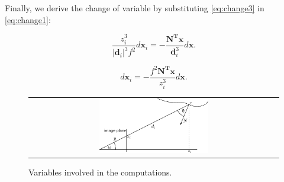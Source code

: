 Finally, we derive the change of variable by substituting \eqref{eq:change3} in  \eqref{eq:change1}:


\begin{equation}
\label{eq:change4}
    \frac{z_i^3}{|\mathbf{d}_i|^3 f^2}d\mathbf{x}_i = -\frac{\mathbf{N^T x}}{\mathbf{d}_i^3}d\mathbf{x}.
\end{equation}

\begin{equation}
\label{eq:change5}
    d\mathbf{x}_i = -\frac{f^2 \mathbf{N^T x}}{z_i^3}d\mathbf{x}.
\end{equation}



\begin{figure}[bt]
 \begin{tabular}{c}
  \includegraphics[width=0.45\textwidth]{./img/ch-appendix/change01}\\
 \end{tabular}
 \caption{Variables involved in the computations.}
 \label{fig:change}
\end{figure}

